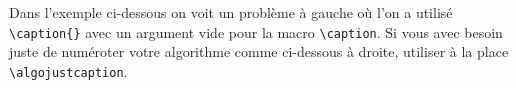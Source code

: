 Dans l'exemple ci-dessous on voit un problème à gauche où l'on a utilisé \verb+\caption{}+ avec un argument vide pour la macro \verb+\caption+.
Si vous avec besoin juste de numéroter votre algorithme comme ci-dessous à droite, utiliser à la place \verb+\algojustcaption+.


\begin{multicols}{2}    
\begin{algo}
    \caption{}

    \Result{\dots}
    \Actions{
        \dots\phantom{X}
        \\
        \phantom{\dots}\vspace{-.75em}
    }
\end{algo}


\begin{algo}
    \algojustcaption

    \Datas{\dots}
    \Result{\dots}
    \Actions{
        \dots\phantom{X}
        \\
        \phantom{\dots}\vspace{-.75em}
    }
\end{algo}
\end{multicols}


